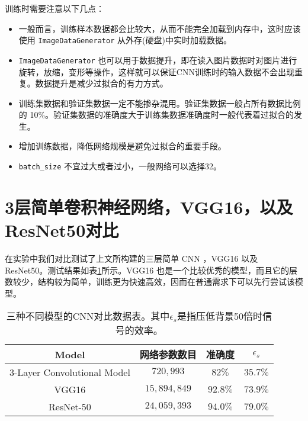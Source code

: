 \vspace{0.5cm}

训练时需要注意以下几点：

\begin{itemize}
    \item 一般而言，训练样本数据都会比较大，从而不能完全加载到内存中，这时应该使用 \verb|ImageDataGenerator| 从外存(硬盘)中实时加载数据。
    \item \verb|ImageDataGenerator| 也可以用于数据提升，即在读入图片数据时对图片进行旋转，放缩，变形等操作，这样就可以保证CNN训练时的输入数据不会出现重复。数据提升是减少过拟合的有力方式。
    \item 训练集数据和验证集数据一定不能掺杂混用。验证集数据一般占所有数据比例的 10\%。验证集数据的准确度大于训练集数据准确度时一般代表着过拟合的发生。
    \item 增加训练数据，降低网络规模是避免过拟合的重要手段。
    \item \verb|batch_size| 不宜过大或者过小，一般网络可以选择32。
\end{itemize}


\section{3层简单卷积神经网络，VGG16，以及ResNet50对比}
\label{section:resnet_compare}

在实验中我们对比测试了上文所构建的三层简单 CNN ，VGG16 以及 ResNet50。测试结果如表\ref{tab:cnn_compare}所示。VGG16 也是一个比较优秀的模型，而且它的层数较少，结构较为简单，训练更为快速高效，因而在普通需求下可以先行尝试该模型。
\renewcommand\arraystretch{1.4}
\begin{table}[hbt]
    \centering
    \caption{三种不同模型的CNN对比数据表。其中$\epsilon_{s}$是指压低背景50倍时信号的效率。}
    \begin{tabular}{cccc}
      \hline
      Model & 网络参数数目 & 准确度 & $\epsilon_{s}$ \\\hline
      3-Layer Convolutional Model & $720,993$ & $82\%$  & $35.7\%$ \\
      VGG16 & $15,894,849$ & $92.8\%$  & $73.9\%$ \\
      ResNet-50 & $24,059,393$ & $94.0\%$ & $79.0\%$ \\\hline
    \end{tabular}
    \label{tab:cnn_compare}
  \end{table}
  
  